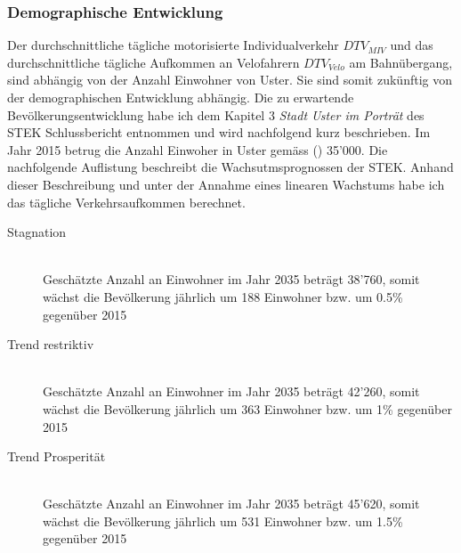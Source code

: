 %
%
%
%


\subsubsection*{Demographische Entwicklung}
\label{subsubsec:Demographie}

Der durchschnittliche tägliche motorisierte Individualverkehr $DTV_{MIV}$ und das durchschnittliche tägliche  Aufkommen an Velofahrern $DTV_{Velo}$ am Bahnübergang, sind abhängig von der Anzahl Einwohner von Uster. Sie sind somit zukünftig von der demographischen Entwicklung abhängig. 
Die zu erwartende Bevölkerungsentwicklung habe ich dem Kapitel 3 \textit{Stadt Uster im Porträt} des STEK Schlussbericht entnommen und wird nachfolgend kurz beschrieben.
Im Jahr 2015 betrug die Anzahl Einwoher in Uster gemäss (\cite{STEK}) 35'000. Die nachfolgende Auflistung beschreibt die Wachsutmsprognossen der STEK. Anhand dieser Beschreibung und unter der Annahme eines linearen Wachstums habe ich das tägliche Verkehrsaufkommen berechnet.

\begin{description}
\item[Stagnation] \hfill \\
Geschätzte Anzahl an Einwohner im Jahr 2035 beträgt 38'760, somit wächst die Bevölkerung jährlich um 188 Einwohner bzw. um 0.5\% gegenüber 2015
\item[Trend restriktiv] \hfill \\
Geschätzte Anzahl an Einwohner im Jahr 2035 beträgt 42'260, somit wächst die Bevölkerung jährlich um 363 Einwohner bzw. um 1\% gegenüber 2015
\item[Trend Prosperität] \hfill \\
Geschätzte Anzahl an Einwohner im Jahr 2035 beträgt 45'620, somit wächst die Bevölkerung jährlich um 531 Einwohner bzw. um 1.5\% gegenüber 2015
\end{description}

